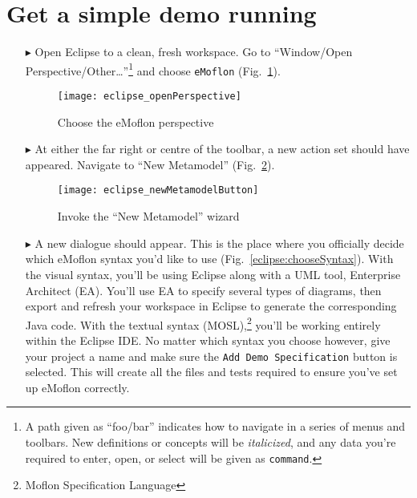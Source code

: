 \newpage
\genHeader

\section{Get a simple demo running}


\begin{itemize}
\hypertarget{simpleDemo common}{} 
\item[$\blacktriangleright$] Open Eclipse to a clean, fresh workspace. Go to ``Window/Open Perspective/Other\ldots''\footnote{A path given as ``foo/bar''
indicates how to navigate in a series of menus and toolbars. New definitions or concepts will be \emph{italicized}, and any data you're required to enter,
open, or select will be given as \texttt{command}.} and choose \texttt{eMoflon} (Fig.~\ref{eclipse:openPerspective}).

\begin{figure}[htbp]
	\centering
  \texttt{[image: eclipse\_openPerspective]}
	\caption{Choose the eMoflon perspective}
	\label{eclipse:openPerspective}
\end{figure} 

\item[$\blacktriangleright$] At either the far right or centre of the toolbar, a new action set should have appeared. Navigate to ``New Metamodel''
(Fig.~\ref{eclipse:newMetamodel}).

\vspace{0.5cm}
\begin{figure}[htbp]
	\centering
  \texttt{[image: eclipse\_newMetamodelButton]}
	\caption{Invoke the ``New Metamodel'' wizard}
	\label{eclipse:newMetamodel}
\end{figure}

\newpage

\item[$\blacktriangleright$] A new dialogue should appear. This is the place where you officially decide which eMoflon syntax you'd like to use
(Fig.~\ref{eclipse:chooseSyntax}). With the visual syntax, you'll be using Eclipse along with a UML tool, Enterprise Architect (EA). You'll use EA to specify
several types of diagrams, then export and refresh your workspace in Eclipse to generate the corresponding Java code. With the textual syntax
(MOSL),\footnote{Moflon Specification Language} you'll be working entirely within the Eclipse IDE. No matter which syntax you choose however, give your project
a name and make sure the \texttt{Add Demo Specification} button is selected. This will create all the files and tests required to ensure you've set up eMoflon
correctly.


\end{itemize}
